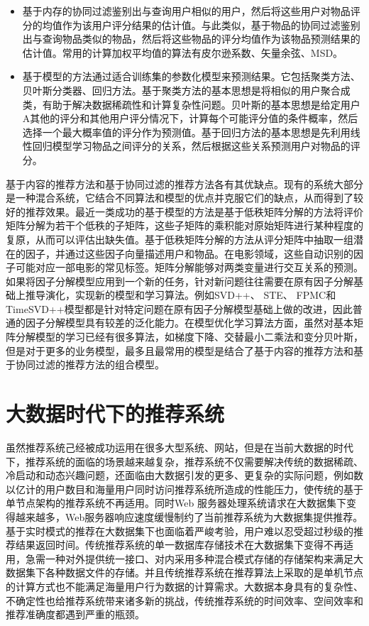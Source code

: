 	\begin{itemize}
		\item 基于内存的协同过滤鉴别出与查询用户相似的用户，然后将这些用户对物品评分的均值作为该用户评分结果的估计值。与此类似，基于物品的协同过滤鉴别出与查询物品类似的物品，然后将这些物品的评分均值作为该物品预测结果的估计值。常用的计算加权平均值的算法有皮尔逊系数、矢量余弦、MSD。
		\item 基于模型的方法通过适合训练集的参数化模型来预测结果。它包括聚类方法、贝叶斯分类器、回归方法。基于聚类方法的基本思想是将相似的用户聚合成类，有助于解决数据稀疏性和计算复杂性问题。贝叶斯的基本思想是给定用户A其他的评分和其他用户评分情况下，计算每个可能评分值的条件概率，然后选择一个最大概率值的评分作为预测值。基于回归方法的基本思想是先利用线性回归模型学习物品之间评分的关系，然后根据这些关系预测用户对物品的评分。
	\end{itemize}
	
	基于内容的推荐方法和基于协同过滤的推荐方法各有其优缺点。现有的系统大部分是一种混合系统，它结合不同算法和模型的优点并克服它们的缺点，从而得到了较好的推荐效果。最近一类成功的基于模型的方法是基于低秩矩阵分解的方法将评价矩阵分解为若干个低秩的子矩阵，这些子矩阵的乘积能对原始矩阵进行某种程度的复原，从而可以评估出缺失值。基于低秩矩阵分解的方法从评分矩阵中抽取一组潜在的因子，并通过这些因子向量描述用户和物品。在电影领域，这些自动识别的因子可能对应一部电影的常见标签。矩阵分解能够对两类变量进行交互关系的预测。如果将因子分解模型应用到一个新的任务，针对新问题往往需要在原有因子分解基础上推导演化，实现新的模型和学习算法。例如SVD++、 STE、 FPMC和TimeSVD++模型都是针对特定问题在原有因子分解模型基础上做的改进，因此普通的因子分解模型具有较差的泛化能力。在模型优化学习算法方面，虽然对基本矩阵分解模型的学习已经有很多算法，如梯度下降、交替最小二乘法和变分贝叶斯，但是对于更多的业务模型，最多且最常用的模型是结合了基于内容的推荐方法和基于协同过滤的推荐方法的组合模型。

\section{大数据时代下的推荐系统}
	虽然推荐系统己经被成功运用在很多大型系统、网站，但是在当前大数据的时代下，推荐系统的面临的场景越来越复杂，推荐系统不仅需要解决传统的数据稀疏、冷启动和动态兴趣问题，还面临由大数据引发的更多、更复杂的实际问题，例如数以亿计的用户数目和海量用户同时访问推荐系统所造成的性能压力，使传统的基于单节点架构的推荐系统不再适用。同时Web 服务器处理系统请求在大数据集下变得越来越多，Web服务器响应速度缓慢制约了当前推荐系统为大数据集提供推荐。基于实时模式的推荐在大数据集下也面临着严峻考验，用户难以忍受超过秒级的推荐结果返回时间。传统推荐系统的单一数据库存储技术在大数据集下变得不再适用，急需一种对外提供统一接口、对内采用多种混合模式存储的存储架构来满足大数据集下各种数据文件的存储。并且传统推荐系统在推荐算法上采取的是单机节点的计算方式也不能满足海量用户行为数据的计算需求。大数据本身具有的复杂性、不确定性也给推荐系统带来诸多新的挑战，传统推荐系统的时间效率、空间效率和推荐准确度都遇到严重的瓶颈。
